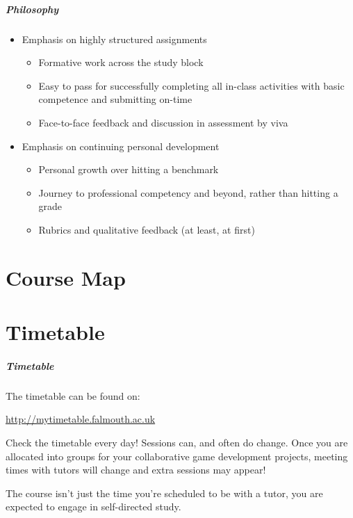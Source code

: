 \begin{frame}
	\frametitle{Philosophy}
	
	\begin{itemize}
		\item Emphasis on highly structured assignments 
		\begin{itemize}
			\item Formative work across the study block
			\item Easy to pass for successfully completing all in-class activities with basic competence and submitting on-time
			\item Face-to-face feedback and discussion in assessment by viva			
		\end{itemize}
		\pause\item Emphasis on continuing personal development
		\begin{itemize}
			\item Personal growth over hitting a benchmark
			\item Journey to professional competency and beyond, rather than hitting a grade
			\item Rubrics and qualitative feedback (at least, at first)			
		\end{itemize}
	\end{itemize}
\end{frame}

\part{Course Map}
\frame{\partpage}






\part{Timetable}
\frame{\partpage}

\begin{frame}
	\frametitle{Timetable}
	
	The timetable can be found on:
	
	\vspace{0.5em}
	
	\indent \url{http://mytimetable.falmouth.ac.uk}
	
	\vspace{0.5em}
	
	Check the timetable every day! Sessions can, and often do change. Once you are allocated into groups for your collaborative game development projects, meeting times with tutors will change and extra sessions may appear!
	
	\vspace{0.5em}
	
	 The course isn't just the time you're scheduled to be with a tutor, you are expected to engage in self-directed study.
	
\end{frame}

